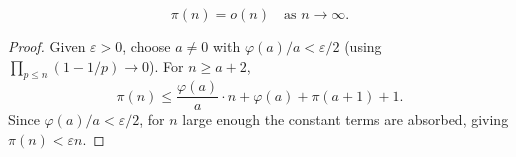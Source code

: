\begin{lemma}
\label{primeCounting-is-o-id}
\leanok
$$\pi(n) = o(n) \quad \text{as } n \to \infty.$$
\end{lemma}
\begin{proof}
\leanok
Given $\varepsilon > 0$, choose $a \neq 0$ with $\varphi(a)/a < \varepsilon/2$
(using $\prod_{p \leq n}(1 - 1/p) \to 0$). For $n \geq a + 2$,
$$\pi(n) \leq \frac{\varphi(a)}{a} \cdot n + \varphi(a) + \pi(a+1) + 1.$$
Since $\varphi(a)/a < \varepsilon/2$, for $n$ large enough the constant terms are absorbed,
giving $\pi(n) < \varepsilon n$.
\end{proof}
